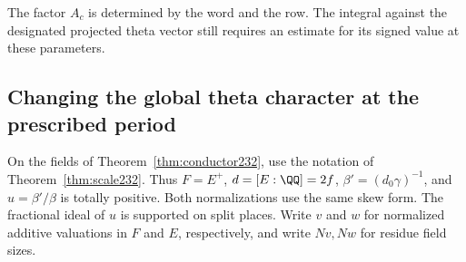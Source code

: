 \documentclass[a4paper,11pt]{article}
\theoremstyle{definition}
\theoremstyle{remark}
\numberwithin{equation}{section}
\begin{document}
The factor \(A_c\) is determined by the word and the row.
The integral against the designated projected theta vector
still requires an estimate for its signed value at these
parameters.

\subsection{Changing the global theta character at the prescribed period}\label{nav:VI-30}
On the fields of Theorem~\ref{thm:conductor232}, use the
notation of Theorem~\ref{thm:scale232}. Thus \(F=E^+\),
\(d=[E:\QQ]=2f\), \(\beta'=(d_0\gamma)^{-1}\), and \(u=\beta'/\beta\)
is totally positive. Both normalizations use the same skew form.
The fractional ideal of \(u\) is supported on split places. Write
\(v\) and \(w\) for normalized additive valuations in \(F\) and
\(E\), respectively, and write \(Nv,Nw\) for residue field sizes.
\end{document}
